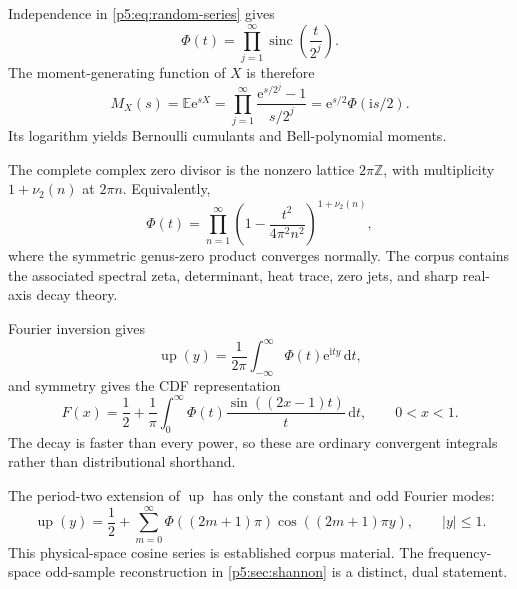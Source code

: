 \documentclass[11pt,oneside]{article}
\theoremstyle{definition}
\newcommand{\dd}{\,\mathrm d}
\newcommand{\e}{\mathrm e}
\newcommand{\ii}{\mathrm i}
\newcommand{\E}{\mathbb E}
\newcommand{\Z}{\mathbb Z}
\newcommand{\Up}{\operatorname{up}}
\newcommand{\sinc}{\operatorname{sinc}}
\newcommand{\vtwo}{\nu_2}
\begin{document}
\baseline Independence in \eqref{p5:eq:random-series} gives
\begin{equation}
 \boxed{\displaystyle
 \Phi(t)=\prod_{j=1}^\infty\sinc\!\left(\frac{t}{2^j}\right).}
                                                               \label{p5:eq:sinc-product}
\end{equation}
The moment-generating function of $X$ is therefore
\begin{equation}
 M_X(s)=\E\e^{sX}
 =\prod_{j=1}^\infty\frac{\e^{s/2^j}-1}{s/2^j}
 =\e^{s/2}\Phi(\ii s/2).                                \label{p5:eq:mgf-product}
\end{equation}
Its logarithm yields Bernoulli cumulants and Bell-polynomial moments.

The complete complex zero divisor is the nonzero lattice $2\pi\Z$, with
multiplicity $1+\vtwo(n)$ at $2\pi n$.  Equivalently,
\begin{equation}
 \Phi(t)=\prod_{n=1}^\infty
 \left(1-\frac{t^2}{4\pi^2n^2}\right)^{1+\vtwo(n)},     \label{p5:eq:canonical-product}
\end{equation}
where the symmetric genus-zero product converges normally.  The corpus
contains the associated spectral zeta, determinant, heat trace, zero jets,
and sharp real-axis decay theory.

Fourier inversion gives
\begin{equation}
 \Up(y)=\frac1{2\pi}\int_{-\infty}^{\infty}
          \Phi(t)\e^{\ii ty}\dd t,                       \label{p5:eq:up-fourier-inversion}
\end{equation}
and symmetry gives the CDF representation
\begin{equation}
 F(x)=\frac12+\frac1\pi\int_0^\infty
       \Phi(t)\frac{\sin((2x-1)t)}{t}\dd t,
 \qquad 0<x<1.                                           \label{p5:eq:F-sine-integral}
\end{equation}
The decay is faster than every power, so these are ordinary convergent
integrals rather than distributional shorthand.

The period-two extension of $\Up$ has only the constant and odd Fourier modes:
\begin{equation}
 \Up(y)=\frac12+\sum_{m=0}^\infty
   \Phi((2m+1)\pi)\cos((2m+1)\pi y),\qquad |y|\le1.      \label{p5:eq:physical-cosine-series}
\end{equation}
This physical-space cosine series is established corpus material.  The
frequency-space odd-sample reconstruction in \cref{p5:sec:shannon} is a distinct,
dual statement.
\end{document}
